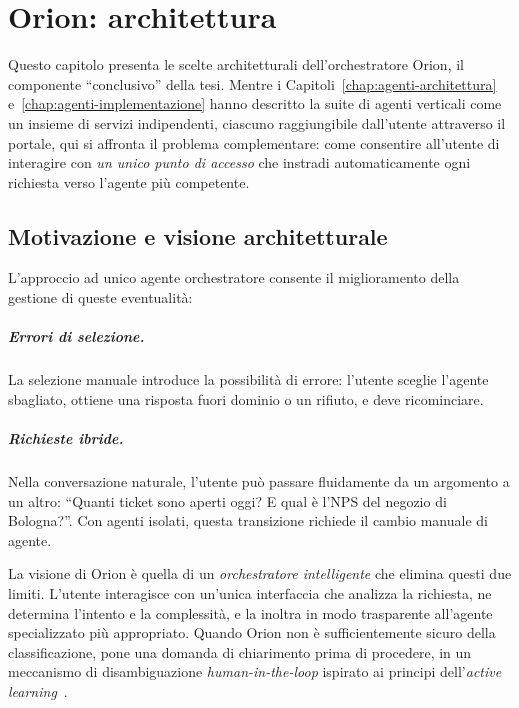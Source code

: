 
\chapter{Orion: architettura}
\label{chap:orion-architettura}

Questo capitolo presenta le scelte architetturali dell'orchestratore Orion, il componente ``conclusivo'' della tesi.
Mentre i Capitoli~\ref{chap:agenti-architettura} e~\ref{chap:agenti-implementazione} hanno descritto la 
suite di agenti verticali come un insieme di servizi indipendenti, 
ciascuno raggiungibile dall'utente attraverso il portale, qui si affronta il problema complementare: 
come consentire all'utente di interagire con \emph{un unico punto di accesso} che instradi automaticamente 
ogni richiesta verso l'agente più competente.

\section{Motivazione e visione architetturale}
\label{sec:orion-motivazione}

L'approccio ad unico agente orchestratore consente il miglioramento della gestione di queste eventualità:

\paragraph{Errori di selezione.} 
La selezione manuale introduce la possibilità di errore: l'utente sceglie l'agente sbagliato, 
ottiene una risposta fuori dominio o un rifiuto, e deve ricominciare. 


\paragraph{Richieste ibride.} Nella conversazione naturale, l'utente può passare fluidamente da un argomento 
a un altro: ``Quanti ticket sono aperti oggi? E qual è l'NPS del negozio di Bologna?''. 
Con agenti isolati, questa transizione richiede il cambio manuale di agente. 

La visione di Orion è quella di un \emph{orchestratore intelligente} che elimina questi due limiti. 
L'utente interagisce con un'unica interfaccia che analizza la richiesta, ne determina l'intento e la complessità, 
e la inoltra in modo trasparente all'agente specializzato più appropriato. 
Quando Orion non è sufficientemente sicuro della classificazione, pone una domanda di chiarimento prima di procedere, 
in un meccanismo di disambiguazione \emph{human-in-the-loop} ispirato ai principi dell'\emph{active learning}~\cite{settles2012active,diao2023activeprompting}.


